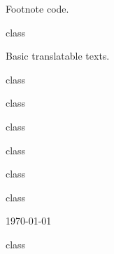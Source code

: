 \documentclass{skdoc}
\begin{document}
	\begin{macro*}{\footnoterule}
	Footnote code.
	\begin{macro*}{\@makefntext}
\begin{MacroCode}{class}
\renewcommand\footnoterule{%
	\kern-3\p@
	\hrule\@width.4\columnwidth
	\kern2.6\p@}
\newcommand\@makefntext[1]{%
	\parindent 1em%
	\noindent
	\hb@xt@1.8em{\hss\@makefnmark}#1}
\end{MacroCode}
	\end{macro*}
	\end{macro*}

	Basic translatable texts.
	\begin{macro}{\contentsname}
\begin{MacroCode}{class}
\newcommand\contentsname{Innehåll}
\end{MacroCode}
	\end{macro}
	\begin{macro}{\refname}
\begin{MacroCode}{class}
\newcommand\refname{Referenser}
\end{MacroCode}
	\end{macro}
	\begin{macro}{\figurename}
\begin{MacroCode}{class}
\newcommand\figurename{Figur}
\end{MacroCode}
	\end{macro}
	\begin{macro}{\tablename}
\begin{MacroCode}{class}
\newcommand\tablename{Tabell}
\end{MacroCode}
	\end{macro}
	\begin{macro}{\appendixname}
\begin{MacroCode}{class}
\newcommand\appendixname{Bilaga}
\end{MacroCode}
	\end{macro}
	\begin{macro}{\abstractname}
\begin{MacroCode}{class}
\newcommand\abstractname{Sammanfattning}
\end{MacroCode}
	\end{macro}
	\begin{macro}{\today}
\begin{MacroCode}{class}
\def\today{\year--\month--\day}
\end{MacroCode}
	\end{macro}
\end{document}
